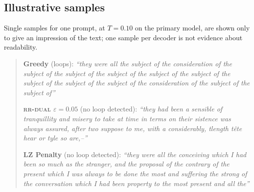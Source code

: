 \subsection{Illustrative samples}
Single samples for one prompt, at $T{=}0.10$ on the primary model, are shown only to give an impression of the text; one sample per decoder is not evidence about readability.
\begin{quote}\small
\textbf{Greedy} (loops): \emph{``they were all the subject of the consideration of the subject of the subject of the subject of the subject of the subject of the subject of the subject of the subject of the consideration of the subject of the subject of''}

\textbf{\textsc{rr-dual} $\varepsilon{=}0.05$} (no loop detected): \emph{``they had been a sensible of tranquillity and misery to take at time in terms on their sistence was always assured, after two suppose to me, with a considerably, tlength t\^ete hear or tyle so are,--''}

\textbf{LZ Penalty} (no loop detected): \emph{``they were all the conceiving which I had been so much as the stranger, and the proposal of the contrary of the present which I was always to be done the most and suffering the strong of the conversation which I had been property to the most present and all the''}
\end{quote}


